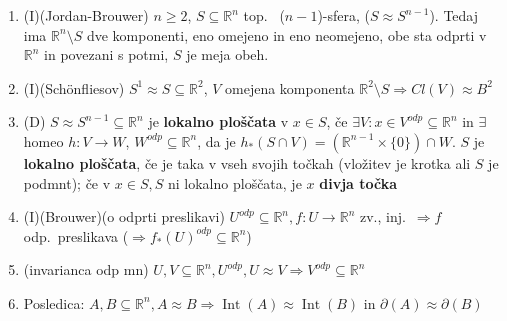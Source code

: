 \documentclass[10pt,a4paper]{article}
\DeclareMathOperator{\Int}{Int}
\begin{document}
\begin{enumerate}

\item (I)(Jordan-Brouwer)  $n \geq 2$, $S \subseteq \mathbb{R}^n$ top.~ ($n-1$)-sfera, ($S \approx S^{n-1}$). Tedaj ima $\mathbb{R}^n \setminus S$ dve komponenti, eno omejeno in eno neomejeno, obe sta odprti v $\mathbb{R}^n$ in povezani s potmi, $S$ je meja obeh.
        
\item (I)(Schönfliesov) $S^1 \approx S \subseteq \mathbb{R}^2$, $V$ omejena komponenta $\mathbb{R}^2 \setminus S \Rightarrow Cl(V) \approx B^2$


\item (D) $S \approx S^{n-1} \subseteq \mathbb{R}^n$ je \textbf{lokalno ploščata} v $x \in S$, če $\exists V: x \in V^{odp} \subseteq \mathbb{R}^n$ in $\exists$ homeo $h: V \rightarrow W$, $W^{odp} \subseteq \mathbb{R}^n$,
    da je $h_\ast(S \cap V) = (\mathbb{R}^{n-1} \times \{ 0\}) \cap W$. \quad $S$ je \textbf{lokalno ploščata}, če je taka v vseh svojih točkah (vložitev je krotka ali $S$ je podmnt);
    če v $x \in S, S$ ni lokalno ploščata, je $x$ \textbf{divja točka}
 

\item (I)(Brouwer)(o odprti preslikavi) $U^{odp} \subseteq \mathbb{R}^n, f:U \rightarrow \mathbb{R}^n$ zv., inj.~$\Rightarrow f$ odp.~preslikava ($\Rightarrow f_\ast(U)^{odp} \subseteq \mathbb{R}^n$)
    
\item (invarianca odp mn) $U, V \subseteq \mathbb{R}^n, U^{odp}, U \approx V \Rightarrow V^{odp} \subseteq \mathbb{R}^n$
    
\item Posledica: $A,B \subseteq \mathbb{R}^n, A \approx B \Rightarrow \Int(A) \approx \Int(B)$ in $\partial(A) \approx \partial(B)$



\end{enumerate}
\end{document}
